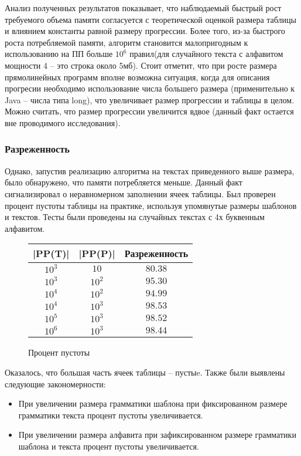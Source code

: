 \documentclass[14pt]{article}
\begin{document}
Анализ полученных результатов показывает, что наблюдаемый быстрый рост требуемого объема памяти согласуется с теоретической оценкой размера таблицы и влиянием константы равной размеру прогрессии. Более того, из-за быстрого роста потребляемой памяти, алгоритм становится малопригодным к использованию на ПП больше $10^6$ правил(для случайного текста с алфавитом мощности 4 -- это строка около 5мб). Стоит отметит, что при росте размера прямолинейных программ вполне возможна ситуация, когда для описания прогресии необходимо использование числа большего размера (применительно к Java -- числа типа long), что увеличивает размер прогрессии и таблицы в целом. Можно считать, что размер прогрессии увеличится вдвое (данный факт остается вне проводимого исследования).

\subsubsection{Разреженность}

Однако, запустив реализацию алгоритма на текстах приведенного выше размера, было обнаружено, что памяти потребляется меньше. Данный факт сигнализировал о неравномерном заполнении ячеек таблицы. Был проверен процент пустоты таблицы на практике, используя упомянутые размеры шаблонов и текстов. Тесты были проведены на случайных текстах с 4х буквенным алфавитом.
\begin{figure}
	\begin{center}
    \begin{tabular}{ | c | c | c |}
        \hline |PP(T)| & |PP(P)| & Разреженность \\
        \hline $10^3$ & $10$ & $80.38$ \\
        \hline $10^3$ & $10^2$ & $95.30$ \\
        \hline $10^4$ & $10^2$ & $94.99$ \\
        \hline $10^4$ & $10^3$ & $98.53$ \\
        \hline $10^5$ & $10^3$ & $98.52$ \\
        \hline $10^6$ & $10^3$ & $98.44$ \\
\hline
    \end{tabular}
    \end{center}
    \caption{Процент пустоты}
    \label{typical_research}
\end{figure}

Оказалось, что большая часть ячеек таблицы -- пустыe. Также были выявлены следующие закономерности:

\begin{itemize}
	\item При увеличении размера грамматики шаблона при фиксированном размере грамматики текста процент пустоты увеличивается.
	\item При увеличении размера алфавита при зафиксированном размере грамматики шаблона и текста процент пустоты увеличивается.
\end{itemize}
\end{document}
